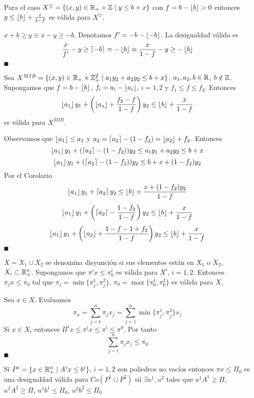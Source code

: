 \documentclass[MIOP.tex]{subfiles}
\begin{document}
\begin{coro}
Para el caso $X^\leq =\{(x,y)\in\mathbb{R}_+\times \mathbb{Z} \mid y\leq b+x\}$ con $f=b-\left\lfloor{b}\right\rfloor>0$ entonces $y\leq \left\lfloor{b}\right\rfloor+\frac{x}{1-f}$ es válida para $X^\leq$.
\end{coro}
\begin{dem}
$x+b\geq y \equiv x-y\geq -b$. Denotamos $f'=-b-\left\lfloor{-b}\right\rfloor$. La desigualdad válida es 
$$
\frac{x}{f'}-y\geq \left\lceil{-b}\right\rceil=-\left\lfloor{b}\right\rfloor \equiv \frac{x}{1-f}-y \geq -\left\lfloor{b}\right\rfloor
$$
$\QED$
\end{dem}
\begin{propi}
Sea $X^{MIR}=\{(x,y)\in\mathbb{R}_+\times \mathbb{Z}_+^2 \mid a_1y_2+a_2y_2\leq b+x\}$, $a_1,a_2,b\in\mathbb{R}$, $b\notin \mathbb{Z}$. Supongamos que $f=b-\left\lfloor{b}\right\rfloor$, $f_i = a_i -\left\lfloor{a_i}\right\rfloor$, $i=1,2$ y $f_1\leq f\leq f_2$. Entonces 
$$
\left\lfloor{a_1}\right\rfloor y_1+\left(\left\lfloor{a_s}\right\rfloor+\frac{f_2-f}{1-f}\right)y_2\leq \left\lfloor{b}\right\rfloor+\frac{x}{1-f}$$
es válida para $X^{MIR}$.
\end{propi}
\begin{dem}
Observamos que $\left\lfloor{a_1}\right\rfloor\leq a_1$ y $a_2=\left\lceil{a_2}\right\rceil-(1-f_2)=\left\lfloor{a_2}\right\rfloor+f_2$. Entonces
$$
\left\lfloor{a_1}\right\rfloor y_1+(\left\lceil{a_2}\right\rceil-(1-f_2))y_2 \leq a_1y_1 + a_2y_2\leq b+x
$$
$$\left\lfloor{a_1}\right\rfloor y_1+(\left\lceil{a_2}\right\rceil-(1-f_2))y_2 \leq b+x+(1-f_2)y_2$$
Por el Corolario
$$
\left\lfloor{a_1}\right\rfloor y_1+\left\lceil{a_2}\right\rceil y_2 \leq \left\lfloor{b}\right\rfloor+\frac{x+(1-f_2)y_2}{1-f}
$$
$$
\left\lfloor{a_1}\right\rfloor y_1+\left(\left\lceil{a_2}\right\rceil-\frac{1-f_2}{1-f}\right)y_2 \leq \left\lfloor{b}\right\rfloor+\frac{x}{1-f}
$$
$$
\left\lfloor{a_1}\right\rfloor y_1+\left(\left\lfloor{a_2}\right\rfloor+\frac{1-f-1+f_2}{1-f}\right)y_2\leq \left\lfloor{b}\right\rfloor+\frac{x}{1-f}
$$
$\QED$
\end{dem}
\begin{prop}
$X=X_1\cup X_2$ se denomina disyunción si sus elementos están en $X_1$ o $X_2$, $X_i\subset \mathbb{R}^n_+$. Supongamos que $\pi^ix\leq \pi^i_0$ es válida para $X^i$, $i=1,2$. Entonces $\pi_j x\leq \pi_0$ tal que $\pi_j=\min\{\pi^1_j,\pi^2_j\}$, $\pi_0 =\max\{\pi^1_0,\pi^2_0\}$ es válida para $X$.
\end{prop}
\begin{dem}
Sea $x\in X$. Evaluamos
$$
\pi_x = \sum_{j=1}^n \pi_j x_j = \sum_{j=1}^n \min\{\pi_j^1,\pi_j^2\}x_j
$$
Si $x\in X_i$ entonces $\Pi^ix \leq \pi^i x \leq \pi^i \leq \pi^0$. Por tanto
$$
\sum_{j=1}^n \pi_j  x_j \leq \pi_0
$$
$\QED$
\end{dem}
\begin{prop}
Si $P^i = \{x\in\mathbb{R}^n_+\mid A^i x \leq b^i\}$, $i=1,2$ son poliedros no vacíos entonces $\pi x\leq \Pi_0$ es una desigualdad válida para $Co(P^1\cup P^2)$ sii $\exists u^1,u^2$ tales que $u^1A^1\geq \Pi$, $u^2A^2 \geq \Pi$, $u^1 b^1 \leq \Pi_0$, $u^2b^2\leq \Pi_0$
\end{prop}
\end{document}
